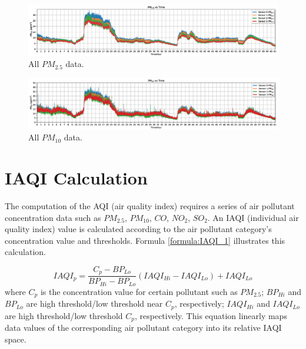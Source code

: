 \begin{figure}[!htbp]
    \begin{center}
    \includegraphics[width=\linewidth]{fig/data/pm25_all.png}
    \end{center}
    \caption{All $PM_{2.5}$ data.}
    \label{fig:pm25_all}
\end{figure}

\begin{figure}[!htbp]
    \begin{center}
    \includegraphics[width=\linewidth]{fig/data/pm10_all.png}
    \end{center}
    \caption{All $PM_{10}$ data.}
    \label{fig:pm10_all}
\end{figure}

\section{IAQI Calculation}

The computation of the AQI (air quality index) requires a series of air pollutant concentration data such as $PM_{2.5}$, $PM_{10}$, $CO$, $NO_{2}$, $SO_{2}$. An IAQI (individual air quality index) value is calculated according to the air pollutant category's concentration value and thresholds. Formula \ref{formula:IAQI_1} illustrates this calculation.

\begin{equation}
    \label{formula:IAQI_1}
    IAQI_p = \frac{C_p-BP_{Lo}}{BP_{Hi}-BP_{Lo}}(IAQI_{Hi}-IAQI_{Lo})+IAQI_{Lo}
\end{equation}
where $C_p$ is the concentration value for certain pollutant such as $PM_{2.5}$; $BP_{Hi}$ and $BP_{Lo}$ are high threshold/low threshold near $C_p$, respectively; $IAQI_{Hi}$ and $IAQI_{Lo}$ are high threshold/low threshold $C_p$, respectively. This equation linearly maps data values of the corresponding air pollutant category into its relative IAQI space.

